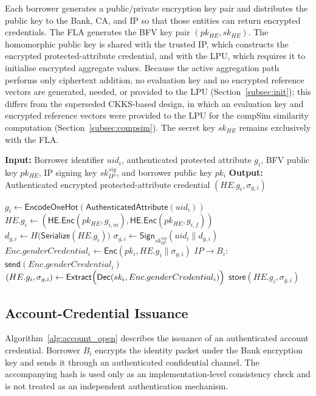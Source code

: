 \documentclass[a4paper,fleqn]{cas-dc}
\begin{document}
Each borrower generates a public/private encryption key pair and distributes
the public key to the Bank, CA, and IP so that those entities can return
encrypted credentials. The FLA generates the BFV key pair
$(pk_{HE},sk_{HE})$. The homomorphic public key is shared with the
trusted IP, which constructs the encrypted protected-attribute credential,
and with the LPU, which requires it to initialise encrypted aggregate values.
Because the active aggregation path performs only ciphertext addition, no
evaluation key and no encrypted reference vectors are generated, needed, or
provided to the LPU (Section~\ref{subsec:init}); this differs from the
superseded CKKS-based design, in which an evaluation key and encrypted
reference vectors were provided to the LPU for the \textsf{compSim}
similarity computation (Section~\ref{subsec:compsim}). The secret key
$sk_{HE}$ remains exclusively with the FLA.

\begin{algorithm}[htbp] \caption{Protected-Attribute Credential Issuance} \label{alg:gender_credential} \small \textbf{Input:} Borrower identifier $uid_i$, authenticated protected attribute $g_i$, BFV public key $pk_{HE}$, IP signing key $sk_{IP}^{sig}$, and borrower public key $pk_i$ \textbf{Output:} Authenticated encrypted protected-attribute credential $(HE.g_i,\sigma_{g,i})$ \begin{algorithmic}[1]  \State $g_i \leftarrow \mathsf{EncodeOneHot} (\mathsf{AuthenticatedAttribute}(uid_i))$ \State $HE.g_i \leftarrow \left( \mathsf{HE.Enc}(pk_{HE},g_{i,m}), \mathsf{HE.Enc}(pk_{HE},g_{i,f}) \right)$ \State $d_{g,i} \leftarrow H\bigl(\mathsf{Serialize}(HE.g_i)\bigr)$ \State $\sigma_{g,i} \leftarrow \mathsf{Sign}_{sk_{IP}^{sig}} (uid_i\parallel d_{g,i})$ \State $Enc.genderCredential_i \leftarrow \mathsf{Enc} (pk_i,HE.g_i\parallel\sigma_{g,i})$ \State $IP\rightarrow B_i$: $\mathsf{send}(Enc.genderCredential_i)$ \State $(HE.g_i,\sigma_{g,i}) \leftarrow \mathsf{Extract}\Bigl( \mathsf{Dec} (sk_i,Enc.genderCredential_i) \Bigr)$ \State $\mathsf{store}(HE.g_i,\sigma_{g,i})$ \EndFor \end{algorithmic} \end{algorithm}



\subsection{Account-Credential Issuance} Algorithm~\ref{alg:account_open} describes the issuance of an authenticated account credential. Borrower $B_i$ encrypts the identity packet under the Bank encryption key and sends it through an authenticated confidential channel. The accompanying hash is used only as an implementation-level consistency check and is not treated as an independent authentication mechanism. 
\end{document}
